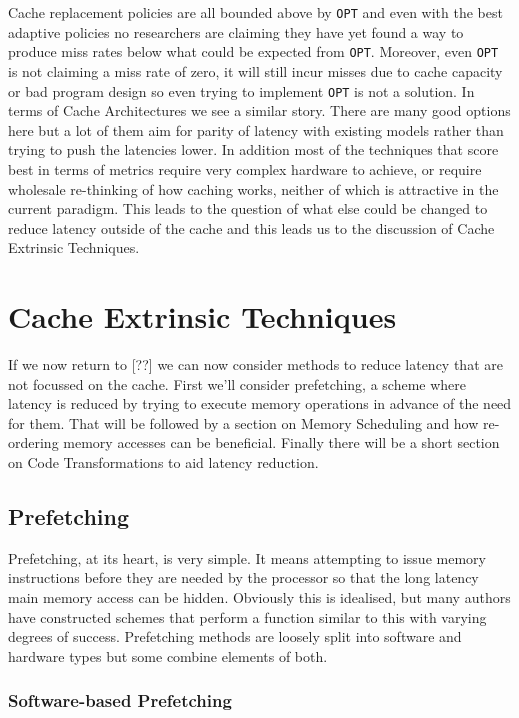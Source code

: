 Cache replacement policies are all bounded above by \texttt{OPT} and even with the best adaptive policies no researchers are claiming they have yet found a way to produce miss rates below what could be expected from \texttt{OPT}. Moreover, even \texttt{OPT} is not claiming a miss rate of zero, it will still incur misses due to cache capacity or bad program design so even trying to implement \texttt{OPT} is not a solution. In terms of Cache Architectures we see a similar story. There are many good options here but a lot of them aim for parity of latency with existing models rather than trying to push the latencies lower. In addition most of the techniques that score best in terms of metrics require very complex hardware to achieve, or require wholesale re-thinking of how caching works, neither of which is attractive in the current paradigm. This leads to the question of what else could be changed to reduce latency outside of the cache and this leads us to the discussion of Cache Extrinsic Techniques.

\section{Cache Extrinsic Techniques}

If we now return to [??] we can now consider methods to reduce latency that are not focussed on the cache. First we'll consider prefetching, a scheme where latency is reduced by trying to execute memory operations in advance of the need for them. That will be followed by a section on Memory Scheduling and how re-ordering memory accesses can be beneficial. Finally there will be a short section on Code Transformations to aid latency reduction.

\subsection{Prefetching}

Prefetching, at its heart, is very simple. It means attempting to issue memory instructions before they are needed by the processor so that the long latency main memory access can be hidden. Obviously this is idealised, but many authors have constructed schemes that perform a function similar to this with varying degrees of success. Prefetching methods are loosely split into software and hardware types but some combine elements of both.

\subsubsection{Software-based Prefetching}

